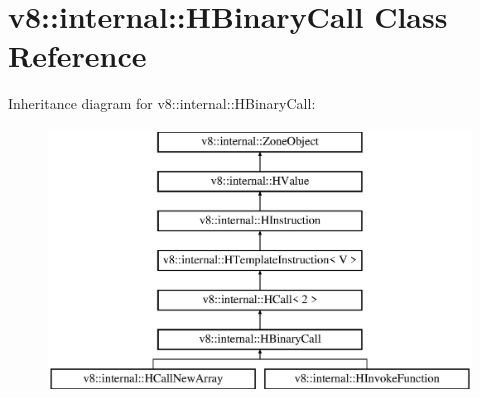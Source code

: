 \hypertarget{classv8_1_1internal_1_1_h_binary_call}{}\section{v8\+:\+:internal\+:\+:H\+Binary\+Call Class Reference}
\label{classv8_1_1internal_1_1_h_binary_call}
Inheritance diagram for v8\+:\+:internal\+:\+:H\+Binary\+Call\+:\begin{figure}[H]
\begin{center}
\leavevmode
\includegraphics[height=7.000000cm]{classv8_1_1internal_1_1_h_binary_call}
\end{center}
\end{figure}
